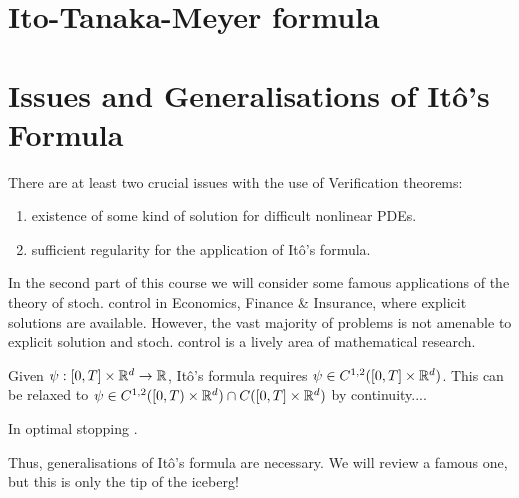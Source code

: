 \section{Ito-Tanaka-Meyer formula}

\section{Issues and Generalisations of Itô's Formula}

\begin{remark}
    There are at least two crucial issues with the use of Verification theorems:
    \begin{enumerate}[label=(\roman*)]
        \item existence of some kind of solution for difficult nonlinear PDEs.
        \item sufficient regularity for the application of Itô's formula.
    \end{enumerate}
    In the second part of this course we will consider some famous applications of the theory of stoch. control in Economics, Finance \& Insurance, where explicit solutions are available. However, the vast majority of problems is not amenable to explicit solution and stoch. control is a lively area of mathematical research.
\end{remark}

\begin{remark}[Reminder]
    Given $\psi: [0,T] \times \mathbb R^d \to \mathbb R$, Itô's formula requires $\psi \in C^{1,2}([0,T] \times \mathbb R^d)$. This can be relaxed to $\psi \in C^{1,2}([0,T) \times \mathbb R^d) \cap C([0,T] \times \mathbb R^d)$ by continuity....

    In optimal stopping .

    Thus, generalisations of Itô's formula are necessary. We will review a famous one, but this is only the tip of the iceberg!
\end{remark}

